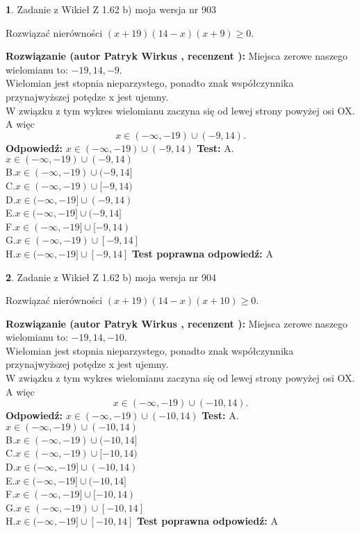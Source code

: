 \documentclass[12pt, a4paper]{article}
\theoremstyle{definition} %
\newtheorem{zad}{}
\newcommand{\zadStart}[1]{\begin{zad}#1\newline}
\newcommand{\zadStop}{\end{zad}}
\newcommand{\rozwStart}[2]{\noindent \textbf{Rozwiązanie (autor #1 , recenzent #2): }\newline}
\newcommand{\rozwStop}{\newline}
\newcommand{\odpStart}{\noindent \textbf{Odpowiedź:}\newline}
\newcommand{\odpStop}{\newline}
\newcommand{\testStart}{\noindent \textbf{Test:}\newline}
\newcommand{\testStop}{\newline}
\newcommand{\kluczStart}{\noindent \textbf{Test poprawna odpowiedź:}\newline}
\newcommand{\kluczStop}{\newline}
\begin{document}
\zadStart{Zadanie z Wikieł Z 1.62 b) moja wersja nr 903}

Rozwiązać nierówności $(x+19)(14-x)(x+9)\ge0$.
\zadStop
\rozwStart{Patryk Wirkus}{}
Miejsca zerowe naszego wielomianu to: $-19, 14, -9$.\\
Wielomian jest stopnia nieparzystego, ponadto znak współczynnika przy\linebreak najwyższej potędze x jest ujemny.\\ W związku z tym wykres wielomianu zaczyna się od lewej strony powyżej osi OX. A więc $$x \in (-\infty,-19) \cup (-9,14).$$
\rozwStop
\odpStart
$x \in (-\infty,-19) \cup (-9,14)$
\odpStop
\testStart
A.$x \in (-\infty,-19) \cup (-9,14)$\\
B.$x \in (-\infty,-19) \cup (-9,14]$\\
C.$x \in (-\infty,-19) \cup [-9,14)$\\
D.$x \in (-\infty,-19] \cup (-9,14)$\\
E.$x \in (-\infty,-19] \cup (-9,14]$\\
F.$x \in (-\infty,-19] \cup [-9,14)$\\
G.$x \in (-\infty,-19) \cup [-9,14]$\\
H.$x \in (-\infty,-19] \cup [-9,14]$
\testStop
\kluczStart
A
\kluczStop



\zadStart{Zadanie z Wikieł Z 1.62 b) moja wersja nr 904}

Rozwiązać nierówności $(x+19)(14-x)(x+10)\ge0$.
\zadStop
\rozwStart{Patryk Wirkus}{}
Miejsca zerowe naszego wielomianu to: $-19, 14, -10$.\\
Wielomian jest stopnia nieparzystego, ponadto znak współczynnika przy\linebreak najwyższej potędze x jest ujemny.\\ W związku z tym wykres wielomianu zaczyna się od lewej strony powyżej osi OX. A więc $$x \in (-\infty,-19) \cup (-10,14).$$
\rozwStop
\odpStart
$x \in (-\infty,-19) \cup (-10,14)$
\odpStop
\testStart
A.$x \in (-\infty,-19) \cup (-10,14)$\\
B.$x \in (-\infty,-19) \cup (-10,14]$\\
C.$x \in (-\infty,-19) \cup [-10,14)$\\
D.$x \in (-\infty,-19] \cup (-10,14)$\\
E.$x \in (-\infty,-19] \cup (-10,14]$\\
F.$x \in (-\infty,-19] \cup [-10,14)$\\
G.$x \in (-\infty,-19) \cup [-10,14]$\\
H.$x \in (-\infty,-19] \cup [-10,14]$
\testStop
\kluczStart
A
\kluczStop
\end{document}
